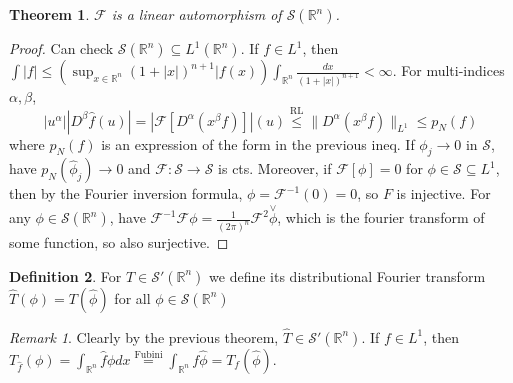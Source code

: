 \documentclass{article}
\theoremstyle{definition}
\newtheorem{defn}{Definition}[section]
\theoremstyle{remark}
\newtheorem{rem}{Remark}
\theoremstyle{plain}
\newtheorem{thm}[defn]{Theorem}
\newcommand{\RR}{\mathbb{R}}
\begin{document}
\begin{thm}
    $\mathcal F$ is a linear automorphism of $\mathcal S(\RR^n)$.
\end{thm}
\begin{proof}
    Can check $\mathcal S(\RR^n)\subseteq L^1(\RR^n)$. If $f\in L^1$, then $\int|f|\le (\sup_{x\in\RR^n}(1+|x|)^{n+1}|f(x))\int_{\RR^n}\frac{dx}{(1+|x|)^{n+1}}<\infty$.
    For multi-indices $\alpha,\beta$,
    \[|u^\alpha||D^\beta\hat f(u)|=|\mathcal F[D^\alpha(x^\beta f)]|(u)\overset{\text{RL}}{\le}\|D^\alpha(x^\beta f)\|_{L^1}\le p_N(f)\] where $p_N(f)$ is an expression of the form in the previous ineq. If $\phi_j\to 0$ in $\mathcal S$, have $p_N(\hat \phi_j)\to 0$ and $\mathcal F:\mathcal S\to \mathcal S$ is cts. Moreover, if $\mathcal F[\phi]=0$ for $\phi\in\mathcal S\subseteq L^1$, then by the Fourier inversion formula, $\phi=\mathcal F^{-1}(0)=0$, so $F$ is injective. For any $\phi\in \mathcal S(\RR^n)$, have $\mathcal F^{-1}\mathcal F\phi=\frac{1}{(2\pi)^n}\mathcal F^2\overset{\vee}{\phi}$, which is the fourier transform of some function, so also surjective.
\end{proof}

\begin{defn}
    For $T\in \mathcal S'(\RR^n)$ we define its distributional Fourier transform $\hat T(\phi)=T(\hat\phi)$ for all $\phi\in\mathcal S(\RR^n)$
\end{defn}
\begin{rem}
    Clearly by the previous theorem, $\hat T\in \mathcal S'(\RR^n)$. If $f\in L^1$, then $T_{\hat f}(\phi)=\int_{\RR^n}\hat f\phi dx\overset{\text{Fubini}}{=}\int_{\RR^n}f\hat\phi= T_f(\hat\phi)$.
\end{rem}
\end{document}
